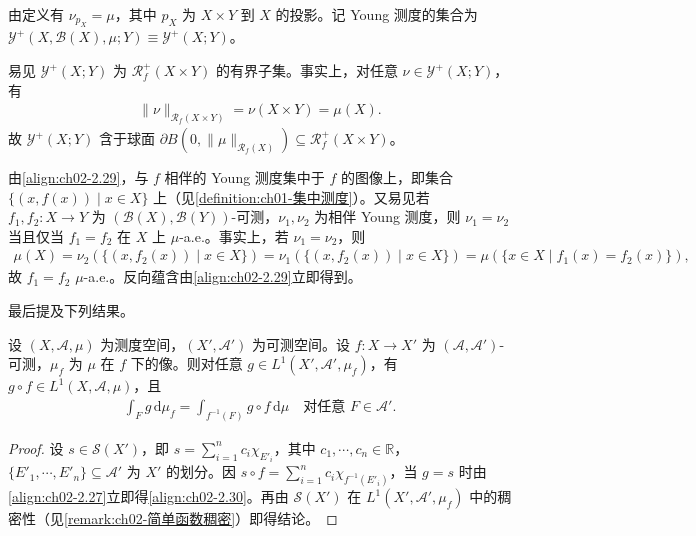 \documentclass[../../main.tex]{subfiles}%
\begin{document}
由定义有 $\nu_{p_X}=\mu$，其中 $p_X$ 为 $X\times Y$ 到 $X$ 的投影。记 Young 测度的集合为 $\mathcal Y^+(X,\mathscr B(X),\mu;Y)\equiv\mathcal Y^+(X;Y)$。

\begin{remark}\label{remark:ch02-Young有界}
易见 $\mathcal Y^+(X;Y)$ 为 $\mathscr R^+_f(X\times Y)$ 的有界子集。事实上，对任意 $\nu\in\mathcal Y^+(X;Y)$，有
\begin{align*}
\|\nu\|_{\mathscr R_f(X\times Y)}=\nu(X\times Y)=\mu(X).
\end{align*}
故 $\mathcal Y^+(X;Y)$ 含于球面 $\partial B(0,\|\mu\|_{\mathscr R_f(X)})\subseteq\mathscr R^+_f(X\times Y)$。
\end{remark}

\begin{remark}\label{remark:ch02-Young图支撑}\label{remark:ch02-Young投影}
由\eqref{align:ch02-2.29}，与 $f$ 相伴的 Young 测度集中于 $f$ 的图像上，即集合 $\{(x,f(x))\mid x\in X\}$ 上（见\cref{definition:ch01-集中测度}）。又易见若 $f_1,f_2:X\to Y$ 为 $(\mathscr B(X),\mathscr B(Y))$-可测，$\nu_1,\nu_2$ 为相伴 Young 测度，则 $\nu_1=\nu_2$ 当且仅当 $f_1=f_2$ 在 $X$ 上 $\mu$-a.e.。事实上，若 $\nu_1=\nu_2$，则
\begin{align*}
\mu(X)=\nu_2(\{(x,f_2(x))\mid x\in X\})
=\nu_1(\{(x,f_2(x))\mid x\in X\})
=\mu(\{x\in X\mid f_1(x)=f_2(x)\}),
\end{align*}
故 $f_1=f_2$ $\mu$-a.e.。反向蕴含由\eqref{align:ch02-2.29}立即得到。
\end{remark}

最后提及下列结果。

\begin{lemma}\label{lemma:ch02-像测度积分}
\label{lemma:ch02-像测度}
设 $(X,\mathscr A,\mu)$ 为测度空间，$(X',\mathscr A')$ 为可测空间。设 $f:X\to X'$ 为 $(\mathscr A,\mathscr A')$-可测，$\mu_f$ 为 $\mu$ 在 $f$ 下的像。则对任意 $g\in L^1(X',\mathscr A',\mu_f)$，有 $g\circ f\in L^1(X,\mathscr A,\mu)$，且
\begin{align}
\int_F g\,\mathrm{d}\mu_f=\int_{f^{-1}(F)}g\circ f\,\mathrm{d}\mu\quad\text{对任意 }F\in\mathscr A'. \label{align:ch02-2.30}
\end{align}
\end{lemma}

\begin{proof}
设 $s\in\mathscr S(X')$，即 $s=\sum_{i=1}^n c_i\chi_{E'_i}$，其中 $c_1,\cdots ,c_n\in\mathbb R$，$\{E'_1,\cdots ,E'_n\}\subseteq\mathscr A'$ 为 $X'$ 的划分。因 $s\circ f=\sum_{i=1}^n c_i\chi_{f^{-1}(E'_i)}$，当 $g=s$ 时由\eqref{align:ch02-2.27}立即得\eqref{align:ch02-2.30}。再由 $\mathscr S(X')$ 在 $L^1(X',\mathscr A',\mu_f)$ 中的稠密性（见\cref{remark:ch02-简单函数稠密}）即得结论。
\end{proof}
\end{document}
